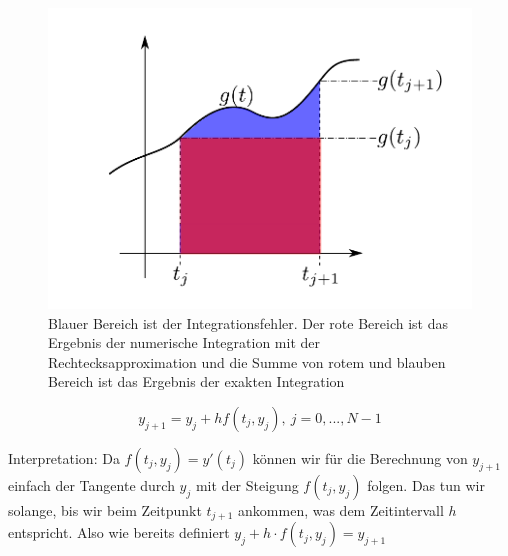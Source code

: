 \documentclass[10pt,a4paper]{article}
\begin{document}
\begin{figure}[H]
\includegraphics[width=\textwidth]{images/rechteckformel-links}
\caption{Blauer Bereich ist der Integrationsfehler. Der rote Bereich ist das Ergebnis der numerische Integration mit der Rechtecksapproximation und die Summe von rotem und blauben Bereich ist das Ergebnis der exakten Integration}
\end{figure}


\begin{defi}
\begin{equation*}
y_{j+1}=y_j+hf(t_j,y_j), ~j=0,...,N-1
\end{equation*}

Interpretation: Da $f(t_j,y_j)=y'(t_j)$ können wir für die Berechnung von $y_{j+1}$ einfach der Tangente durch $y_j$ mit der Steigung $f(t_j,y_j)$ folgen. Das tun wir solange, bis wir beim Zeitpunkt $t_{j+1}$ ankommen, was dem Zeitintervall $h$ entspricht. Also wie bereits definiert $y_j + h\cdot f(t_j,y_j) = y_{j+1} $
\end{defi}

%
%
%
\end{document}
